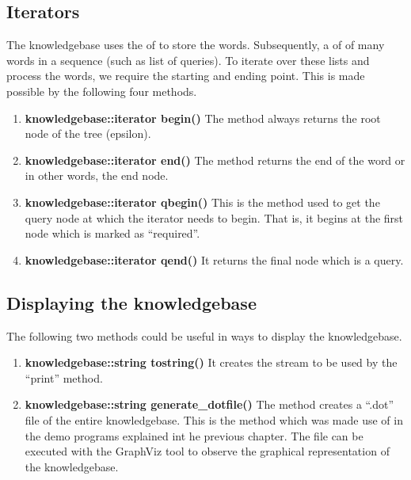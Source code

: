 \subsection*{Iterators}

	The knowledgebase uses the \lists of \integer to store the words. Subsequently, a \lists of \lists of \integer many words in a sequence (such as list of queries). To iterate over these lists and process the words, we require the starting and ending point. This is made possible by the following four methods.
\begin{enumerate}
\item \textbf{knowledgebase::iterator begin()} \vskip 1pt
	The method always returns the root node of the tree (epsilon).

\item \textbf{knowledgebase::iterator end()} \vskip 1pt
	The method returns the end of the word or in other words, the end node. 
	 
\item \textbf{knowledgebase::iterator qbegin()} \vskip 1pt
	This is the method used to get the query node at which the iterator needs to begin. That is, it begins at the first node which is marked as ``required''.
	
\item \textbf{knowledgebase::iterator qend()} \vskip 1pt
	It returns the final node which is a query.
\end{enumerate}

\subsection*{Displaying the knowledgebase}
The following two methods could be useful in ways to display the knowledgebase.

\begin{enumerate}

\item \textbf{knowledgebase::string tostring()} \vskip 1pt
It creates the \stringtype stream to be used by the ``print'' method.

\item \textbf{knowledgebase::string generate\_dotfile()} \vskip 1pt
	The method creates a ``.dot'' file of the entire knowledgebase. This is the method which was made use of in the demo programs explained int he previous chapter. The file can be executed with the GraphViz tool to observe the graphical representation of the knowledgebase. 
\end {enumerate}

